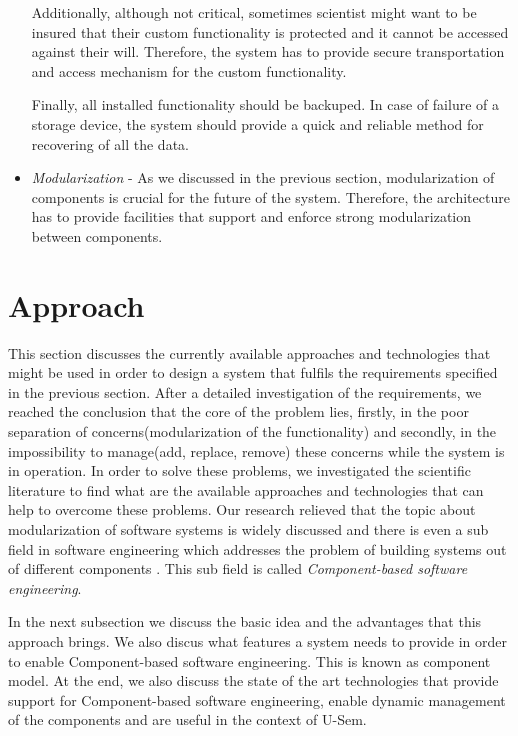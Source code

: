 \begin{itemize}
	Additionally, although not critical, sometimes scientist might want to be insured that their custom functionality is protected and it cannot be accessed against their will. Therefore, the system has to provide secure transportation and access mechanism for the custom functionality.
	
	Finally, all installed functionality should be backuped. In case of failure of a storage device, the system should provide a quick and reliable method for recovering of all the data.
	
	\item \textit{Modularization} - As we discussed in the previous section, modularization of components is crucial for the future of the system. Therefore, the architecture has to provide facilities that support and enforce strong modularization between components.
	
\end{itemize}

\section{Approach}
\label{sec:approachPlugin}

This section discusses the currently available approaches and technologies that might be used in order to design a system that fulfils the requirements specified in the previous section. After a detailed investigation of the requirements, we reached the conclusion that the core of the problem lies, firstly, in the poor separation of concerns(modularization of the functionality) and secondly, in the impossibility to manage(add, replace, remove) these concerns while the system is in operation. In order to solve these problems, we investigated the scientific literature to find what are the available approaches and technologies that can help to overcome these problems. Our research relieved that the topic about modularization of software systems is widely discussed and there is even a sub field in software engineering which addresses the problem of building systems out of different components \cite{Jifeng}. This sub field is called \textit{Component-based software engineering}. 

In the next subsection we discuss the basic idea and the advantages that this approach brings. We also discus what features a system needs to provide in order to enable Component-based software engineering. This is known as component model. At the end, we also discuss the state of the art technologies that provide support for Component-based software engineering, enable dynamic management of the components and are useful in the context of U-Sem. 

